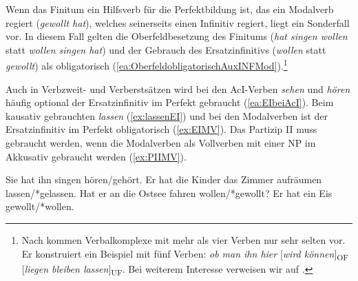 Wenn das Finitum ein Hilfsverb für die Perfektbildung ist, das ein Modalverb regiert (\textit{gewollt hat}), welches seinerseits einen Infinitiv regiert, liegt ein Sonderfall vor. In diesem Fall gelten die Oberfeldbesetzung des Finitums (\textit{hat singen wollen} statt \textit{wollen singen hat}) und der Gebrauch des Ersatzinfinitivs (\textit{wollen} statt \textit{gewollt}) als obligatorisch (\ref{ea:OberfeldobligatorischAuxINFMod}).\footnote{Nach \citet[64]{Bech1983} kommen Verbalkomplexe mit mehr als vier Verben nur sehr selten vor. Er konstruiert ein Beispiel mit fünf Verben: \textit{ob man ihn hier} [\textit{wird können}]\textsubscript{OF} [\textit{liegen bleiben lassen}]\textsubscript{UF}. Bei weiterem Interesse verweisen wir auf \citet[67--68]{Pafel2011}.}

\ea \label{ea:Oberfeldobligatorisch} 
\label{ea:OberfeldobligatorischAuxINFMod}
\label{ex:Oberfeldverstoß}
\z 
\z 

Auch in Verbzweit- und Verberstsätzen wird bei den AcI-Verben \textit{sehen} und \textit{hören} häufig optional der Ersatzinfinitiv im Perfekt gebraucht (\ref{ea:EIbeiAcI}). Beim kausativ gebrauchten \textit{lassen} (\ref{ex:lassenEI}) und bei den Modalverben ist der Ersatzinfinitiv im Perfekt obligatorisch (\ref{ex:EIMV}). Das Partizip II muss gebraucht werden, wenn die Modalverben als Vollverben mit einer NP im Akkusativ gebraucht werden (\ref{ex:PIIMV}).

\ea \label{ea:Ersatzinfinitiv}
\ea \label{ea:EIbeiAcI} Sie hat ihn singen hören/gehört.
\ex \label{ex:lassenEI} Er hat die Kinder das Zimmer aufräumen lassen/*gelassen.
\ex \label{ex:EIMV} Hat er an die Ostsee fahren wollen/*gewollt?
\ex \label{ex:PIIMV} Er hat ein Eis gewollt/*wollen.
\z 
\z 

